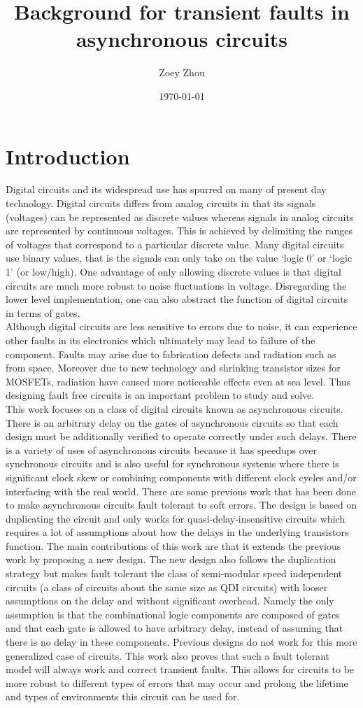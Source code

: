 \documentclass[12pt]{report}
\title{Background for transient faults in asynchronous circuits}
\author{Zoey Zhou}
\date{\today}
\begin{document}
\chapter{Introduction}
Digital circuits and its widespread use has spurred on many of present day technology.  Digital circuits differs from analog circuits in that its signals (voltages) can be represented as discrete values whereas signals in analog circuits are represented by continuous voltages.  This is achieved by delimiting the ranges of voltages that correspond to a particular discrete value.  Many digital circuits use binary values, that is the signals can only take on the value `logic 0' or `logic 1' (or low/high).  One advantage of only allowing discrete values is that digital circuits are much more robust to noise fluctuations in voltage.  Disregarding the lower level implementation, one can also abstract the function of digital circuits in terms of gates.\\

Although digital circuits are less sensitive to errors due to noise, it can experience other faults in its electronics which ultimately may lead to failure of the component.  Faults may arise due to fabrication defects and radiation such as from space.  Moreover due to new technology and shrinking transistor sizes for MOSFETs, radiation have caused more noticeable effects even at sea level. Thus designing fault free circuits is an important problem to study and solve.  \\  %

This work focuses on a class of digital circuits known as asynchronous circuits.  There is an arbitrary delay on the gates of asynchronous circuits so that each design must be additionally verified to operate correctly under such delays.  There is a variety of uses of asynchronous circuits because it has speedups over synchronous circuits and is also useful for synchronous systems where there is significant clock skew or combining components with different clock cycles and/or interfacing with the real world.  There are some previous work that has been done to make asynchronous circuits fault tolerant to soft errors.  The design is based on duplicating the circuit and only works for quasi-delay-insensitive circuits which requires a lot of assumptions about how the delays in the underlying transistors function.  The main contributions of this work are that it extends the previous work by proposing a new design.  The new design also follows the duplication strategy but makes fault tolerant the class of semi-modular speed independent circuits (a class of circuits about the same size as QDI circuits) with looser assumptions on the delay and without significant overhead.  Namely the only assumption is that the combinational logic components are composed of gates and that each gate is allowed to have arbitrary delay, instead of assuming that there is no delay in these components.  Previous designs do not work for this more generalized case of circuits.  This work also proves that such a fault tolerant model will always work and correct transient faults.  This allows for circuits to be more robust to different types of errors that may occur and prolong the lifetime and types of environments this circuit can be used for.
\end{document}

